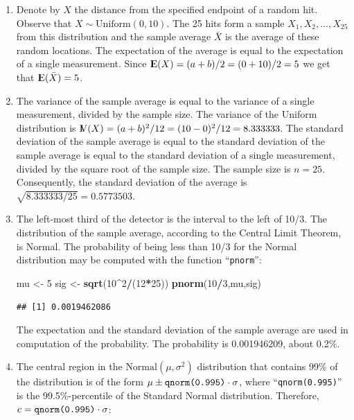 \documentclass[]{krantz}
\makeatletter
\newenvironment{Shaded}{\begin{snugshade}}{\end{snugshade}}
\newcommand{\KeywordTok}[1]{\textcolor[rgb]{0.13,0.29,0.53}{\textbf{#1}}}
\newcommand{\DecValTok}[1]{\textcolor[rgb]{0.00,0.00,0.81}{#1}}
\newcommand{\StringTok}[1]{\textcolor[rgb]{0.31,0.60,0.02}{#1}}
\newcommand{\OperatorTok}[1]{\textcolor[rgb]{0.81,0.36,0.00}{\textbf{#1}}}
\newcommand{\NormalTok}[1]{#1}
\newcommand{\Expec}{{\rm I\kern-.3em E}}
\newcommand{\Var}{{\rm I\kern-.3em V}}
\newenvironment{kframe}{%
\medskip{}
\setlength{\fboxsep}{.8em}
 \def\at@end@of@kframe{}%
 \ifinner\ifhmode%
  \def\at@end@of@kframe{\end{minipage}}%
  \begin{minipage}{\columnwidth}%
 \fi\fi%
 \def\FrameCommand##1{\hskip\@totalleftmargin \hskip-\fboxsep
 \colorbox{shadecolor}{##1}\hskip-\fboxsep
     \hskip-\linewidth \hskip-\@totalleftmargin \hskip\columnwidth}%
 \MakeFramed {\advance\hsize-\width
   \@totalleftmargin\z@ \linewidth\hsize
   \@setminipage}}%
 {\par\unskip\endMakeFramed%
 \at@end@of@kframe}
\renewenvironment{Shaded}{\begin{kframe}}{\end{kframe}}
\theoremstyle{definition}
\theoremstyle{definition}
\theoremstyle{definition}
\theoremstyle{remark}
\makeatother
\begin{document}
\begin{enumerate}
\def\labelenumi{\arabic{enumi}.}
\item
  Denote by \(X\) the distance from the specified endpoint of a random
  hit. Observe that \(X \sim \mbox{Uniform}(0,10)\). The 25 hits form a
  sample \(X_1, X_2, \ldots, X_{25}\) from this distribution and the
  sample average \(\bar X\) is the average of these random locations.
  The expectation of the average is equal to the expectation of a single
  measurement. Since \(\Expec(X) = (a + b)/2 = (0 + 10)/2 = 5\) we get
  that \(\Expec(\bar X) = 5\).
\item
  The variance of the sample average is equal to the variance of a
  single measurement, divided by the sample size. The variance of the
  Uniform distribution is
  \(\Var(X) = (a + b)^2/12 = (10-0)^2/12 = 8.333333\). The standard
  deviation of the sample average is equal to the standard deviation of
  the sample average is equal to the standard deviation of a single
  measurement, divided by the square root of the sample size. The sample
  size is \(n=25\). Consequently, the standard deviation of the average
  is \(\sqrt{8.333333/25}=0.5773503\).
\item
  The left-most third of the detector is the interval to the left of
  10/3. The distribution of the sample average, according to the Central
  Limit Theorem, is Normal. The probability of being less than 10/3 for
  the Normal distribution may be computed with the function
  ``\texttt{pnorm}'':

\begin{Shaded}
\begin{Highlighting}[]
\NormalTok{mu <-}\StringTok{ }\DecValTok{5}
\NormalTok{sig <-}\StringTok{ }\KeywordTok{sqrt}\NormalTok{(}\DecValTok{10}\OperatorTok{^}\DecValTok{2}\OperatorTok{/}\NormalTok{(}\DecValTok{12}\OperatorTok{*}\DecValTok{25}\NormalTok{))}
\KeywordTok{pnorm}\NormalTok{(}\DecValTok{10}\OperatorTok{/}\DecValTok{3}\NormalTok{,mu,sig)}
\end{Highlighting}
\end{Shaded}

\begin{verbatim}
## [1] 0.0019462086
\end{verbatim}

  The expectation and the standard deviation of the sample average are
  used in computation of the probability. The probability is
  0.001946209, about 0.2\%.
\item
  The central region in the \(\mbox{Normal}(\mu,\sigma^2)\) distribution
  that contains 99\% of the distribution is of the form
  \(\mu \pm \mbox{\texttt{qnorm(0.995)}}\cdot \sigma\), where
  ``\texttt{qnorm(0.995)}'' is the 99.5\%-percentile of the Standard
  Normal distribution. Therefore,
  \(c =\mbox{\texttt{qnorm(0.995)}}\cdot \sigma\):


\end{enumerate}
\end{document}

